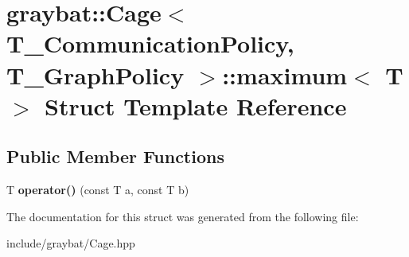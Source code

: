 \hypertarget{structgraybat_1_1Cage_1_1maximum}{}\section{graybat\+:\+:Cage$<$ T\+\_\+\+Communication\+Policy, T\+\_\+\+Graph\+Policy $>$\+:\+:maximum$<$ T $>$ Struct Template Reference}
\label{structgraybat_1_1Cage_1_1maximum}
\subsection*{Public Member Functions}
\begin{DoxyCompactItemize}
\item 
\hypertarget{structgraybat_1_1Cage_1_1maximum_ad12352d7f5fe5828a9ac06926cbe683f}{}T {\bfseries operator()} (const T a, const T b)\label{structgraybat_1_1Cage_1_1maximum_ad12352d7f5fe5828a9ac06926cbe683f}

\end{DoxyCompactItemize}


The documentation for this struct was generated from the following file\+:\begin{DoxyCompactItemize}
\item 
include/graybat/Cage.\+hpp\end{DoxyCompactItemize}
